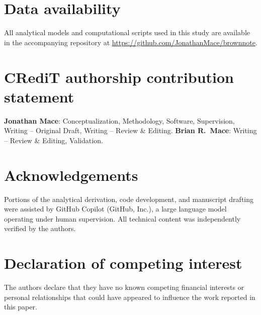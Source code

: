 \documentclass[review]{elsarticle}
\begin{document}





\section*{Data availability}
All analytical models and computational scripts used in this study are
available in the accompanying repository at
\url{https://github.com/JonathanMace/brownnote}.

\section*{CRediT authorship contribution statement}
\textbf{Jonathan Mace}: Conceptualization, Methodology, Software, Supervision,
Writing -- Original Draft, Writing -- Review \& Editing.
\textbf{Brian R.\ Mace}: Writing -- Review \& Editing, Validation.

\section*{Acknowledgements}
Portions of the analytical derivation, code development, and manuscript
drafting were assisted by GitHub Copilot (GitHub, Inc.), a large language
model operating under human supervision.  All technical content was
independently verified by the authors.

\section*{Declaration of competing interest}
The authors declare that they have no known competing financial interests
or personal relationships that could have appeared to influence the work
reported in this paper.
\end{document}
